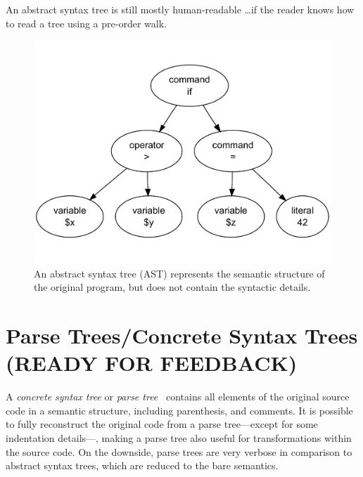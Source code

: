 
An abstract syntax tree is still mostly human-readable \ldots if the reader knows how to read a tree using a pre-order walk.

\begin{figure}[htb]
  \begin{center}
    \includegraphics[scale=0.4]{images/ast}
    \caption{An abstract syntax tree (AST) represents the semantic structure of the original program, but does not contain the syntactic details.}
    \label{fig:ast}
  \end{center}
\end{figure}



\section{Parse Trees/Concrete Syntax Trees (READY FOR FEEDBACK)}
\label{parse-tree}

A \emph{concrete syntax tree} or \emph{parse tree}~\cite{compiler-construction, compilers} contains all elements of the original source code in a semantic structure, including parenthesis, and comments. It is possible to fully reconstruct the original code from a parse tree---except for some indentation details---, making a parse tree also useful for transformations within the source code. On the downside, parse trees are very verbose in comparison to abstract syntax trees, which are reduced to the bare semantics.

